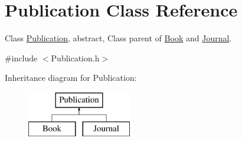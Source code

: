 \hypertarget{class_publication}{}\section{Publication Class Reference}
\label{class_publication}


Class \hyperlink{class_publication}{Publication}, abstract, Class parent of \hyperlink{class_book}{Book} and \hyperlink{class_journal}{Journal}.  




{\ttfamily \#include $<$Publication.\+h$>$}

Inheritance diagram for Publication\+:\begin{figure}[H]
\begin{center}
\leavevmode
\includegraphics[height=2.000000cm]{class_publication}
\end{center}
\end{figure}
